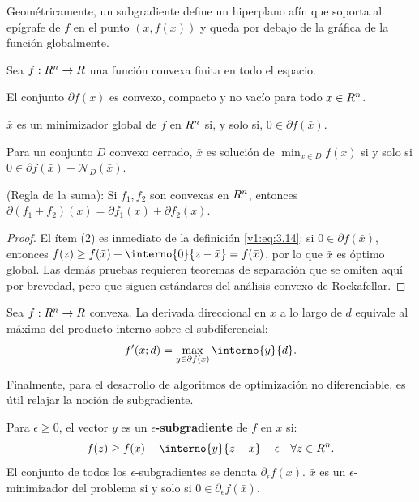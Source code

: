Geométricamente, un subgradiente define un hiperplano afín que soporta al epígrafe de $f$ en el punto $(x, f(x))$ y queda por debajo de la gráfica de la función globalmente.

\begin{theorem}\label{v1:thm:3.4.8}
 Sea $f : R^n \to R$ una función convexa finita en todo el espacio.
 \begin{enuthm}
 \item El conjunto $\partial f(x)$ es convexo, compacto y no vacío para todo $x \in R^n$.
 \item $\bar{x}$ es un minimizador global de $f$ en $R^n$  si, y solo si, $0 \in \partial f(\bar{x})$.
 \item Para un conjunto $D$ convexo cerrado, $\bar{x}$ es solución de $\min_{x \in D} f(x)$ si y solo si $0 \in \partial f(\bar{x}) + \mathcal{N}_D(\bar{x})$.
 \item (Regla de la suma): Si $f_1, f_2$ son convexas en $R^n$, entonces $\partial (f_1 + f_2)(x) = \partial f_1(x) + \partial f_2(x)$.
 \end{enuthm}
\end{theorem}

\begin{proof}
 El ítem (2) es inmediato de la definición \eqref{v1:eq:3.14}: si $0 \in \partial f(\bar{x})$, entonces $f(z) \ge f(\bar{x}) + \interno{0}{z-\bar{x}} = f(\bar{x})$, por lo que $\bar{x}$ es óptimo global. Las demás pruebas requieren teoremas de separación que se omiten aquí por brevedad, pero que siguen estándares del análisis convexo de Rockafellar.
\end{proof}

\begin{theorem}\label{v1:thm:3.4.9}
 Sea $f : R^n \to R$ convexa. La derivada direccional en $x$ a lo largo de $d$ equivale al máximo del producto interno sobre el subdiferencial:
 \[
 f'(x; d) = \max_{y \in \partial f(x)} \interno{y}{d}.
 \]
\end{theorem}

Finalmente, para el desarrollo de algoritmos de optimización no diferenciable, es útil relajar la noción de subgradiente.

\begin{definition}\label{v1:def:3.4.2}
 Para $\epsilon \ge 0$, el vector $y$ es un \textbf{$\epsilon$-subgradiente} de $f$ en $x$ si:
 \[
 f(z) \ge f(x) + \interno{y}{z-x} - \epsilon \quad \forall z \in \Rn.
 \]
 El conjunto de todos los $\epsilon$-subgradientes se denota $\partial_\epsilon f(x)$. $\bar{x}$ es un $\epsilon$-minimizador del problema si y solo si $0 \in \partial_\epsilon f(\bar{x})$.
\end{definition}
